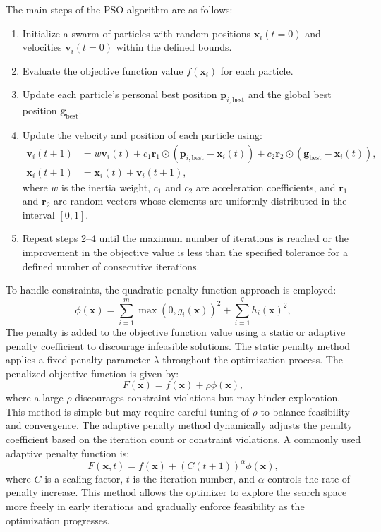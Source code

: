 \documentclass[12pt]{article}
\begin{document}
The main steps of the PSO algorithm are as follows:
\begin{enumerate}
    \item Initialize a swarm of particles with random positions $\mathbf{x}_{i}(t=0)$ and velocities $\mathbf{v}_{i}(t=0)$ within the defined bounds.
    \item Evaluate the objective function value $f(\mathbf{x}_i)$ for each particle.
    \item Update each particle's personal best position $\mathbf{p}_{i,\text{best}}$ and the global best position $\mathbf{g}_{\text{best}}$.
    \item Update the velocity and position of each particle using:
    \begin{align*}
        \mathbf{v}_{i}(t+1) &= w \mathbf{v}_{i}(t) + c_1 \mathbf{r}_1 \odot (\mathbf{p}_{i,\text{best}} - \mathbf{x}_{i}(t)) + c_2 \mathbf{r}_2 \odot (\mathbf{g}_{\text{best}} - \mathbf{x}_{i}(t)), \\
        \mathbf{x}_{i}(t+1) &= \mathbf{x}_{i}(t) + \mathbf{v}_{i}(t+1),
    \end{align*}
    where $w$ is the inertia weight, $c_1$ and $c_2$ are acceleration coefficients, and $\mathbf{r}_1$ and $\mathbf{r}_2$ are random vectors whose elements are uniformly distributed in the interval $[0,1]$.
    \item Repeat steps 2--4 until the maximum number of iterations is reached or the improvement in the objective value is less than the specified tolerance for a defined number of consecutive iterations.
\end{enumerate}

To handle constraints, the quadratic penalty function approach is employed:
\begin{equation*}
    \phi(\mathbf{x}) = \sum_{i=1}^{m} \max(0, g_i(\mathbf{x}))^2 + \sum_{i=1}^{q} h_i(\mathbf{x})^2,
\end{equation*}
The penalty is added to the objective function value using a static or adaptive penalty coefficient to discourage infeasible solutions. The static penalty method applies a fixed penalty parameter $\lambda$ throughout the optimization process. The penalized objective function is given by:
\begin{equation*}
    F(\mathbf{x}) = f(\mathbf{x}) + \rho \phi(\mathbf{x}),
\end{equation*}
where a large $\rho$ discourages constraint violations but may hinder exploration. This method is simple but may require careful tuning of $\rho$ to balance feasibility and convergence. The adaptive penalty method dynamically adjusts the penalty coefficient based on the iteration count or constraint violations. A commonly used adaptive penalty function is:
\begin{equation*}
    F(\mathbf{x}, t) = f(\mathbf{x}) + (C (t + 1))^{\alpha} \phi(\mathbf{x}),
\end{equation*}
where $C$ is a scaling factor, $t$ is the iteration number, and $\alpha$ controls the rate of penalty increase. This method allows the optimizer to explore the search space more freely in early iterations and gradually enforce feasibility as the optimization progresses.
\end{document}
